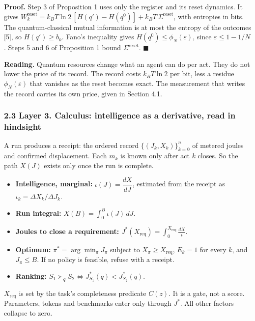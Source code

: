 \documentclass[
  10pt,
]{article}
\providecommand{\tightlist}{%
  \setlength{\itemsep}{0pt}\setlength{\parskip}{0pt}}
\begin{document}
\textbf{Proof.} Step 3 of Proposition 1 uses only the register and its
reset dynamics. It gives
\(W_k^{\mathrm{reset}} = k_B T\ln 2\,[H(q') - H(q^0)] + k_B T\,\Sigma^{\mathrm{reset}}\),
with entropies in bits. The quantum-classical mutual information is at
most the entropy of the outcomes {[}5{]}, so \(H(q') \ge b_k\). Fano's
inequality gives \(H(q^0) \le \phi_N(\varepsilon)\), since
\(\varepsilon \le 1 - 1/N\). Steps 5 and 6 of Proposition 1 bound
\(\Sigma^{\mathrm{reset}}\). \(\blacksquare\)

\textbf{Reading.} Quantum resources change what an agent can do per act.
They do not lower the price of its record. The record costs
\(k_B T\ln 2\) per bit, less a residue \(\phi_N(\varepsilon)\) that
vanishes as the reset becomes exact. The measurement that writes the
record carries its own price, given in Section 4.1.

\subsubsection{2.3 Layer 3. Calculus: intelligence as a derivative, read
in
hindsight}\label{layer-3.-calculus-intelligence-as-a-derivative-read-in-hindsight}

A run produces a receipt: the ordered record
\(\{(J_k, X_k)\}_{k=0}^{n}\) of metered joules and confirmed
displacement. Each \(m_k\) is known only after act \(k\) closes. So the
path \(X(J)\) exists only once the run is complete.

\begin{itemize}
\tightlist
\item
  \textbf{Intelligence, marginal:} \(\iota(J) = \dfrac{dX}{dJ}\),
  estimated from the receipt as \(\iota_k = \Delta X_k/\Delta J_k\).
\item
  \textbf{Run integral:} \(X(B) = \int_0^B \iota(J)\,dJ\).
\item
  \textbf{Joules to close a requirement:}
  \(J^*(X_{\mathrm{req}}) = \int_0^{X_{\mathrm{req}}} \frac{dX}{\iota}\).
\item
  \textbf{Optimum:} \(\pi^* = \arg\min_\pi J_\pi\) subject to
  \(X_\pi \ge X_{\mathrm{req}}\), \(E_k = 1\) for every \(k\), and
  \(J_\pi \le B\). If no policy is feasible, refuse with a receipt.
\item
  \textbf{Ranking:}
  \(S_1 \succ_q S_2 \iff J^*_{S_1}(q) < J^*_{S_2}(q)\).
\end{itemize}

\(X_{\mathrm{req}}\) is set by the task's completeness predicate
\(C(z)\). It is a gate, not a score. Parameters, tokens and benchmarks
enter only through \(J^*\). All other factors collapse to zero.
\end{document}
